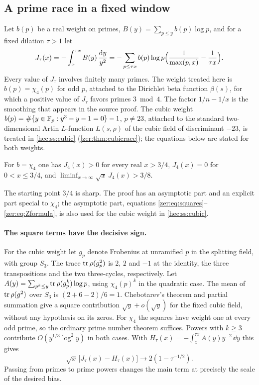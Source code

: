 \subsection{A prime race in a fixed window}\label{zer:sec:window}

Let $b(p)$ be a real weight on primes, $B(y)=\sum_{p\le y}b(p)\log p$, and for a fixed
dilation $\tau>1$ let
\begin{equation}\label{zer:eq:Jh}
 J_\tau(x)=-\int_x^{\tau x}B(y)\,\frac{\mathrm{d} y}{y^2}
 =-\sum_{p\le\tau x}b(p)\log p\Bigl(\frac1{\max(p,x)}-\frac1{\tau x}\Bigr).
\end{equation}
Every value of $J_\tau$ involves finitely many primes. The weight treated here is
$b(p)=\chi_4(p)$ for odd $p$, attached to the Dirichlet beta function $\beta(s)$, for which
a positive value of $J_\tau$ favors primes $3\bmod4$. The factor $1/n-1/x$ is the smoothing
that appears in the source proof. The cubic weight $b(p)=\#\{y\in\mathbb{F}_p:y^3-y-1=0\}-1$,
$p\ne23$, attached to the standard two-dimensional Artin $L$-function $L(s,\rho)$ of the
cubic field of discriminant $-23$, is treated in \cref{hec:ss:cubic}
(\cref{zer:thm:cubicrace}); the equations below are stated for both weights.

\begin{theorem}\label{zer:thm:mod4}
For $b=\chi_4$ one has $J_4(x)>0$ for every real $x>3/4$, $J_4(x)=0$ for $0<x\le3/4$, and
$\liminf_{x\to\infty}\sqrt x\,J_4(x)>3/8$.
\end{theorem}

The starting point $3/4$ is sharp. The proof has an asymptotic part and an explicit part
special to $\chi_4$; the asymptotic part, equations
\eqref{zer:eq:squares}--\eqref{zer:eq:Zformula}, is also used for the cubic weight in
\cref{hec:ss:cubic}.

\paragraph{The square terms have the decisive sign.}
For the cubic weight let $g_p$ denote Frobenius at unramified $p$ in the splitting field,
with group $S_3$. The trace $\operatorname{tr}\rho(g_p^2)$ is $2$, $2$ and $-1$ at the identity, the three
transpositions and the two three-cycles, respectively. Let
$A(y)=\sum_{p^k\le y}\operatorname{tr}\rho(g_p^k)\log p$, using $\chi_4(p)^k$ in the quadratic case. The
mean of $\operatorname{tr}\rho(g^2)$ over $S_3$ is $(2+6-2)/6=1$. Chebotarev's theorem and partial
summation give a square contribution $\sqrt y+o(\sqrt y)$ for the fixed cubic field, without
any hypothesis on its zeros. For $\chi_4$ the squares have weight one at every odd prime, so
the ordinary prime number theorem suffices. Powers with $k\ge3$ contribute
$O(y^{1/3}\log^2y)$ in both cases. With $H_\tau(x)=-\int_x^{\tau x}A(y)y^{-2}\,\dd y$ this
gives
\begin{equation}\label{zer:eq:squares}
 \sqrt x\,\bigl[J_\tau(x)-H_\tau(x)\bigr]\longrightarrow2(1-\tau^{-1/2}).
\end{equation}
Passing from primes to prime powers changes the main term at precisely the scale of the
desired bias.

